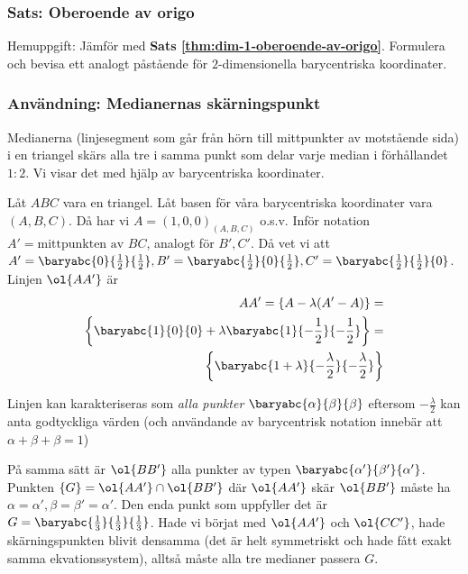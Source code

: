 

\subsubsection{Sats: Oberoende av origo}
Hemuppgift: Jämför med \textbf{Sats \ref{thm:dim-1-oberoende-av-origo}}.
Formulera och bevisa ett analogt påstående för $2$-dimensionella barycentriska koordinater.

\subsubsection{Användning: Medianernas skärningspunkt}
Medianerna (linjesegment som går från hörn till mittpunkter av motstående sida)
i en triangel skärs alla tre i samma punkt som delar varje median i förhållandet $1:2$. Vi visar det med
hjälp av barycentriska koordinater.

Låt $ABC$ vara en triangel. Låt basen för våra barycentriska koordinater vara $(A, B, C)$.
Då har vi $A = (1, 0, 0)_{(A,B,C)}$ o.s.v. 
Inför notation $A' = \text{mittpunkten av } BC$, analogt för $B', C'$.
Då vet vi att $A' = \baryabc{0} {\frac{1}{2}} {\frac{1}{2}}, 
    B' = \baryabc{\frac{1}{2}} {0} {\frac{1}{2}},
    C' = \baryabc{\frac{1}{2}} {\frac{1}{2}} {0}$.
Linjen $\ol{AA'}$ är
\begin{eqnarray*}
    AA' = \{A - \lambda (A'-A)\} = \\
    \left\{ 
    \baryabc{1}{0}{0} + \lambda \baryabc{1} {-\frac{1}{2}} {-\frac{1}{2}}
    \right\} = \\
    \left\{ 
    \baryabc{1 + \lambda } {-\frac{\lambda}{2} } {-\frac{\lambda}{2}}
    \right\}
\end{eqnarray*}

Linjen kan karakteriseras som \textit{alla punkter $\baryabc{\alpha}{\beta}{\beta}$}
eftersom $-\frac{\lambda}{2}$ kan anta godtyckliga värden (och användande av barycentrisk
notation innebär att $\alpha + \beta + \beta = 1$)

På samma sätt är $\ol{BB'}$ alla punkter av typen $\baryabc{\alpha'}{\beta'}{\alpha'}$.
Punkten $\{G\} = \ol{AA'} \cap \ol{BB'}$ där $\ol{AA'}$ skär $\ol{BB'}$ måste ha 
$\alpha = \alpha', \beta = \beta' = \alpha'$.
Den enda punkt som uppfyller det är $G= \baryabc{\frac{1}{3}} {\frac{1}{3}} {\frac{1}{3}}$.
Hade vi börjat med $\ol{AA'}$ och $\ol{CC'}$, hade skärningspunkten blivit
densamma (det är helt symmetriskt och hade fått exakt samma ekvationssystem),
alltså måste alla tre medianer passera $G$.


